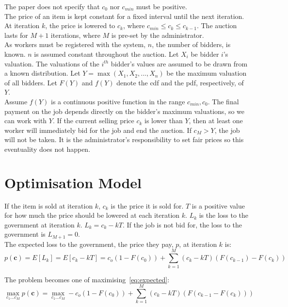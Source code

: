 The paper does not specify that $c_0$ nor $c_{min}$ must be positive. \\

The price of an item is kept constant for a fixed interval until the next iteration. At iteration $k$, the price is lowered to $c_k$, where $c_{min} \le c_k \le c_{k-1}$. The auction lasts for $M + 1$ iterations, where $M$ is pre-set by the administrator. \\

As workers must be registered with the system, $n$, the number of bidders, is known. $n$ is assumed constant throughout the auction. Let $X_i$ be bidder $i$'s valuation. The valuations of the $i^{th}$ bidder's values are assumed to be drawn from a known distribution. Let $Y = \max(X_1, X_2, ..., X_n)$ be the maximum valuation of all bidders. Let $F(Y)$ and $f(Y)$ denote the \gls{cdf} and the \gls{pdf}, respectively, of $Y$. \\

Assume $f(Y)$ is a continuous positive function in the range $c_{min}, c_0$. The final payment on the job depends directly on the bidder's maximum valuations, so we can work with $Y$. If the current selling price $c_k$ is lower than $Y$, then at least one worker will immediately bid for the job and end the auction. If $c_M > Y$, the job will not be taken. It is the administrator's responsibility to set fair prices so this eventuality does not happen.

\section{Optimisation Model}
If the item is sold at iteration $k$, $c_k$ is the price it is sold for. $T$ is a positive value for how much the price should be lowered at each iteration $k$. $L_k$ is the loss to the government at iteration $k$. $L_k = c_k - kT$. If the job is not bid for, the loss to the government is $L_{M+1} = 0$. \\

The expected loss to the government, the price they pay, $p$, at iteration $k$ is:
\begin{dmath}
\label{eq:expected}
p(\textbf{c}) = E[L_k]
= E[c_k - kT]
= c_o(1 - F(c_0)) + \sum\limits_{k=1}^M(c_k - kT)(F(c_{k-1}) - F(c_k))
\end{dmath}

The problem becomes one of maximising~\ref{eq:expected}:
\begin{dmath}
\label{eq:max}
\max_{c_1...c_M} p(\textbf{c}) = \max_{c_1...c_M} -c_o(1 - F(c_0)) + \sum\limits_{k=1}^M(c_k - kT)(F(c_{k-1} - F(c_k)))
\end{dmath}


